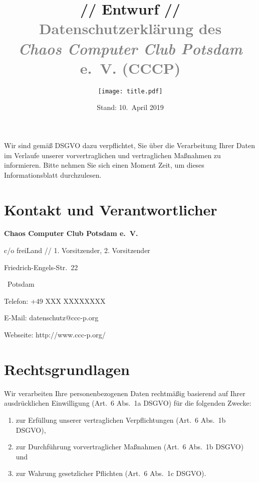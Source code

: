 \documentclass[a4paper, 10pt, headings=normal]{scrartcl}
\title{\textcolor{alert}{// Entwurf //} \textcolor{gray}{Datenschutzerklärung des \\ \emph{Chaos Computer Club Potsdam} e.~V. (CCCP)}}
\author{\texttt{[image: title.pdf]}}
\date{Stand: 10.~April 2019}
\begin{document}
\maketitle
\pagestyle{myheadings}

\begin{multicols*}{2}

\noindent Wir sind gemäß DSGVO dazu verpflichtet, Sie über die Verarbeitung Ihrer Daten im Verlaufe unserer vorvertraglichen und vertraglichen Maßnahmen zu informieren.
Bitte nehmen Sie sich einen Moment Zeit, um dieses Informationsblatt durchzulesen.

\section{Kontakt und Verantwortlicher}%
%
\begin{address}\strut%
	\textbf{Chaos Computer Club Potsdam e.~V.}

	\noindent c/o freiLand // \textcolor{alert}{1. Vorsitzender, 2. Vorsitzender}

	\noindent Friedrich-Engels-Str.~22

	~Potsdam

	\medskip

	\noindent Telefon: +49 \textcolor{alert}{XXX XXXXXXXX}

	\noindent E-Mail: datenschutz@ccc-p.org

	\noindent Webseite: http://www.ccc-p.org/\strut
\end{address}

\section{Rechtsgrundlagen}

Wir verarbeiten Ihre personenbezogenen Daten rechtmäßig basierend auf Ihrer ausdrücklichen Einwilligung (Art.~6 Abs.~1a DSGVO) für die folgenden Zwecke:

\begin{enumerate}[label={\arabic*.}]
	\item
		zur Erfüllung unserer vertraglichen Verpflichtungen (Art.~6 Abs.~1b DSGVO),
	\item
		zur Durchführung vorvertraglicher Maßnahmen (Art.~6 Abs.~1b DSGVO) und
	\item
		zur Wahrung gesetzlicher Pflichten (Art.~6 Abs.~1c DSGVO).
\end{enumerate}


\end{multicols*}
\end{document}

